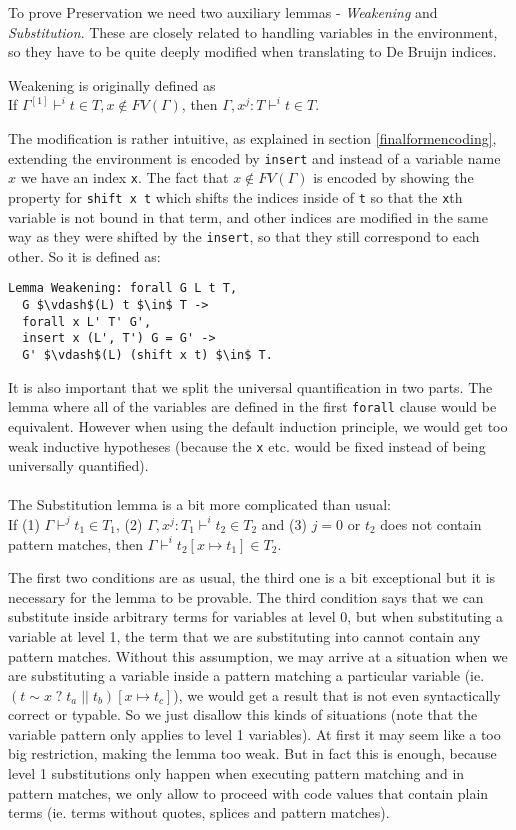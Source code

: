 \documentclass[runningheads]{article}
\begin{document}
To prove Preservation we need two auxiliary lemmas - \textit{Weakening} and \textit{Substitution}. These are closely related to handling variables in the environment, so they have to be quite deeply modified when translating to De Bruijn indices.

Weakening is originally defined as 
\\
If $\Gamma^{[1]} \vdash^i t \in T, x \not\in FV(\Gamma)$, then $\Gamma, x^j : T \vdash^i t \in T$.

The modification is rather intuitive, as explained in section \ref{finalformencoding}, extending the environment is encoded by \verb|insert| and instead of a variable name $x$ we have an index \verb|x|. The fact that $x \not\in FV(\Gamma)$ is encoded by showing the property for \verb|shift x t| which shifts the indices inside of \verb|t| so that the \verb|x|th variable is not bound in that term, and other indices are modified in the same way as they were shifted by the \verb|insert|, so that they still correspond to each other. So it is defined as:
\begin{lstlisting}[mathescape=true]
Lemma Weakening: forall G L t T,
  G $\vdash$(L) t $\in$ T ->
  forall x L' T' G',
  insert x (L', T') G = G' ->
  G' $\vdash$(L) (shift x t) $\in$ T.
\end{lstlisting}
It is also important that we split the universal quantification in two parts. The lemma where all of the variables are defined in the first \verb|forall| clause would be equivalent. However when using the default induction principle, we would get too weak inductive hypotheses (because the \verb|x| etc. would be fixed instead of being universally quantified).

\paragraph{}

The Substitution lemma is a bit more complicated than usual:
\\
If (1) $\Gamma \vdash^j t_1 \in T_1$, (2) $\Gamma, x^j : T_1 \vdash^i t_2 \in T_2$ and
(3) $j = 0$ or $t_2$ does not contain pattern matches, then $\Gamma \vdash^i t_2[x \mapsto t_1] \in T_2$.

The first two conditions are as usual, the third one is a bit exceptional but it is necessary for the lemma to be provable.
The third condition says that we can substitute inside arbitrary terms for variables at level 0, but when substituting a variable at level 1, the term that we are substituting into cannot contain any pattern matches. Without this assumption, we may arrive at a situation when we are substituting a variable inside a pattern matching a particular variable (ie. $(t \sim x \; ? \; t_a \; || \; t_b)[x \mapsto t_c]$), we would get a result that is not even syntactically correct or typable. So we just disallow this kinds of situations (note that the variable pattern only applies to level 1 variables). At first it may seem like a too big restriction, making the lemma too weak. But in fact this is enough, because level 1 substitutions only happen when executing pattern matching and in pattern matches, we only allow to proceed with code values that contain plain terms (ie. terms without quotes, splices and pattern matches).
\end{document}
